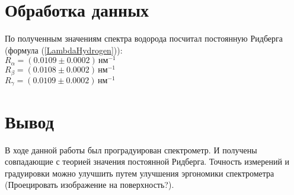 
\section{Обработка данных}

По полученным значениям спектра водорода посчитал постоянную Ридберга (формула
(\ref{LambdaHydrogen})): \\

$ R_\alpha = \left( 0.0109 \pm 0.0002 \right) \, \texttt{нм} ^{-1} $ \\
$ R_\beta  = \left( 0.0108 \pm 0.0002 \right) \, \texttt{нм} ^{-1} $ \\
$ R_\gamma = \left( 0.0109 \pm 0.0002 \right) \, \texttt{нм} ^{-1} $ \\

\section{Вывод}

В ходе данной работы был проградуирован спектрометр. И получены совпадающие с теорией
значения постоянной Ридберга. Точность измерений и градуировки можно улучшить путем
улучшения эргономики спектрометра (Проецировать изображение на поверхность?).
